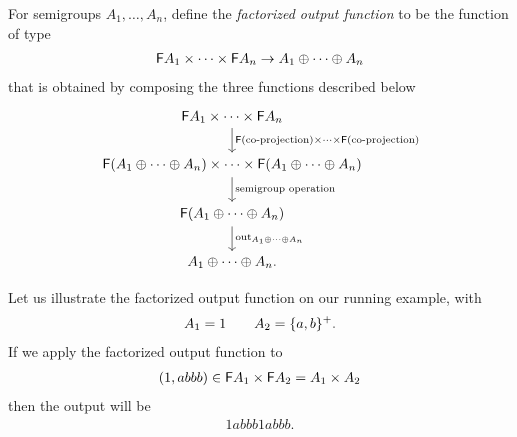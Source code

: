 For semigroups $A_1,\ldots,A_n$, define the \emph{factorized output function} to be the 
function of type 
\begin{align*}
\mathsf F A_1 \times \cdots \times \mathsf F A_n \to A_1 \oplus \cdots \oplus A_n
\end{align*}
that is obtained by composing the three functions described below
\[
\begin{tikzcd}
\functor A_1 \times \cdots \times \functor A_n
\ar[d,"\functor(\text{co-projection}) \times \cdots \times \functor(\text{co-projection})"]
\\
\functor(A_1 \oplus \cdots \oplus A_n)
\times
\cdots
\times 
\functor(A_1 \oplus \cdots \oplus A_n)
\ar[d,"\text{semigroup operation}"]
\\
\functor(A_1 \oplus \cdots \oplus A_n)
\ar[d, "\outfun_{A_1 \oplus \cdots \oplus A_n}"]\\ 
A_1 \oplus \cdots \oplus A_n.
\end{tikzcd}
\]

Let us illustrate the factorized output function on our running example, with 
\begin{align*}
A_1 = 1 \qquad A_2 = \{a,b\}^+.
\end{align*}
If we apply the factorized output function to 
\begin{align*}
(1, abbb)  \in \mathsf F A_1 \times \mathsf F A_2 = A_1 \times A_2
\end{align*}
then the output will be 
\begin{align*}
1 abbb 1 abbb.
\end{align*}

